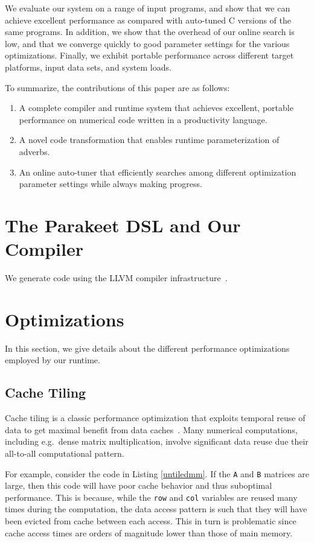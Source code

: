 \documentclass[preprint,9pt]{sigplanconf}
\begin{document}
We evaluate our system on a range of input programs, and show that we can achieve excellent performance as compared with auto-tuned C versions of the same programs.  In addition, we show that the overhead of our online search is low, and that we converge quickly to good parameter settings for the various optimizations.  Finally, we exhibit portable performance across different target platforms, input data sets, and system loads.

To summarize, the contributions of this paper are as follows:

\begin{enumerate}
 \item A complete compiler and runtime system that achieves excellent, portable performance on numerical code written in a productivity language.
 \item A novel code transformation that enables runtime parameterization of adverbs.
 \item An online auto-tuner that efficiently searches among different optimization parameter settings while always making progress.
\end{enumerate}

\section{The Parakeet DSL and Our Compiler}
\label{parakeet}
We generate code using the LLVM compiler infrastructure~\cite{Latt02}.

\section{Optimizations}
\label{optimizations}

In this section, we give details about the different performance optimizations employed by our runtime.

\subsection{Cache Tiling}
\label{cache_tiling}

Cache tiling is a classic performance optimization that exploits temporal reuse of data to get maximal benefit from data caches~\cite{Lam91, Wolf91}.  Many numerical computations, including e.g.~dense matrix multiplication, involve significant data reuse due their all-to-all computational pattern.

For example, consider the code in Listing \ref{untiledmm}.  If the \lstinline{A} and \lstinline{B} matrices are large, then this code will have poor cache behavior and thus suboptimal performance.  This is because, while the \lstinline{row} and \lstinline{col} variables are reused many times during the computation, the data access pattern is such that they will have been evicted from cache between each access.  This in turn is problematic since cache access times are orders of magnitude lower than those of main memory.
\end{document}
